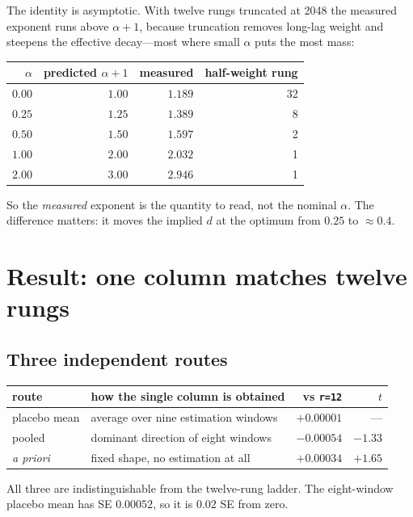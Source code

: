 \documentclass[11pt,a4paper]{article}
\begin{document}
The identity is asymptotic. With twelve rungs truncated at 2048 the measured
exponent runs above $\alpha+1$, because truncation removes long-lag weight and
steepens the effective decay---most where small $\alpha$ puts the most mass:

\begin{table}[h]
\centering
\begin{tabular}{rrrr}
\toprule
$\alpha$ & predicted $\alpha+1$ & measured & half-weight rung \\
\midrule
$0.00$ & $1.00$ & $1.189$ & 32 \\
$0.25$ & $1.25$ & $1.389$ & 8 \\
$0.50$ & $1.50$ & $1.597$ & 2 \\
$1.00$ & $2.00$ & $2.032$ & 1 \\
$2.00$ & $3.00$ & $2.946$ & 1 \\
\bottomrule
\end{tabular}
\end{table}

\noindent
So the \emph{measured} exponent is the quantity to read, not the nominal
$\alpha$. The difference matters: it moves the implied $d$ at the optimum from
$0.25$ to $\approx 0.4$.

\section{Result: one column matches twelve rungs}
\label{sec:rank1}

\subsection{Three independent routes}

\begin{table}[h]
\centering
\begin{tabular}{llrr}
\toprule
route & how the single column is obtained & vs \texttt{r=12} & $t$ \\
\midrule
placebo mean & average over nine estimation windows & $+0.00001$ & --- \\
pooled & dominant direction of eight windows & $-0.00054$ & $-1.33$ \\
\emph{a priori} & fixed shape, no estimation at all & $+0.00034$ & $+1.65$ \\
\bottomrule
\end{tabular}
\end{table}

\noindent
All three are indistinguishable from the twelve-rung ladder. The eight-window
placebo mean has SE $0.00052$, so it is $0.02$ SE from zero.
\end{document}

